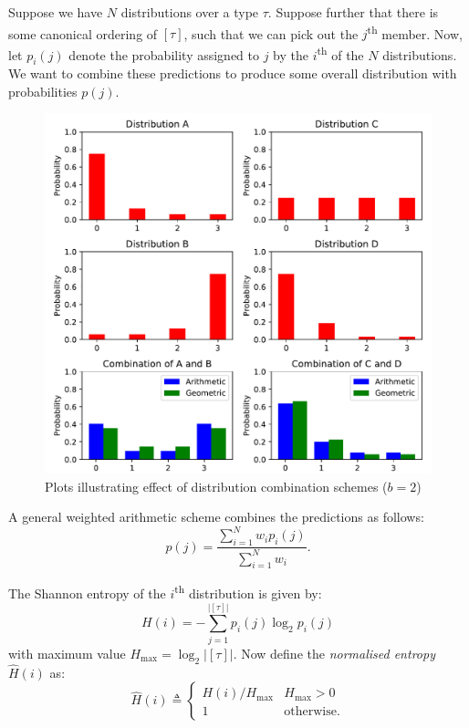 \documentclass[12pt,a4paper,twoside,openright]{report}
\begin{document}
Suppose we have $N$ distributions over a type $\tau$. Suppose further that
there is some canonical ordering of $[\tau]$, such that we can pick out the
$j$\textsuperscript{th} member. Now, let $p_i(j)$ denote the probability
assigned to $j$ by the $i$\textsuperscript{th} of the $N$ distributions. We want
to combine these predictions to produce some overall distribution with
probabilities $p(j)$.

\begin{figure}[H]
\centering
\includegraphics[width=400pt]{figs/dist_comb.pdf}
\caption{Plots illustrating effect of distribution combination schemes ($b = 2$)}
\label{fig:dist-comb-plot}
\end{figure}

A general weighted arithmetic scheme combines the predictions as follows:
$$
  p(j) = \frac{ \sum_{i = 1}^N w_i p_i(j) }{ \sum_{i = 1}^N w_i }.
$$

The Shannon entropy of the $i$\textsuperscript{th} distribution is given by:
$$ H(i) = - \sum_{j = 1}^{|[\tau]|} p_i(j) \log_2 p_i(j) $$
with maximum value $H_{\mathrm{max}} = \log_2{ |[\tau]| }$. Now define the
\emph{normalised entropy} $\hat{H}(i)$ as:
$$ \hat{H}(i) \triangleq \begin{cases}
  H(i)/H_{\mathrm{max}} & H_{\mathrm{max}} > 0 \\
  1 & \text{otherwise.}
\end{cases} $$
\end{document}
